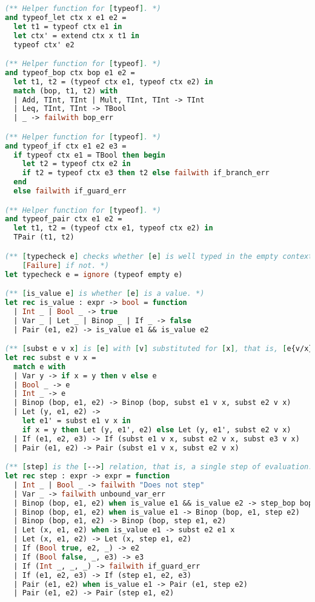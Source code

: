 \begin{lstlisting}[language=OCaml]
(** Helper function for [typeof]. *)
and typeof_let ctx x e1 e2 =
  let t1 = typeof ctx e1 in
  let ctx' = extend ctx x t1 in
  typeof ctx' e2

(** Helper function for [typeof]. *)
and typeof_bop ctx bop e1 e2 =
  let t1, t2 = (typeof ctx e1, typeof ctx e2) in
  match (bop, t1, t2) with
  | Add, TInt, TInt | Mult, TInt, TInt -> TInt
  | Leq, TInt, TInt -> TBool
  | _ -> failwith bop_err

(** Helper function for [typeof]. *)
and typeof_if ctx e1 e2 e3 =
  if typeof ctx e1 = TBool then begin
    let t2 = typeof ctx e2 in
    if t2 = typeof ctx e3 then t2 else failwith if_branch_err
  end
  else failwith if_guard_err

(** Helper function for [typeof]. *)
and typeof_pair ctx e1 e2 =
  let t1, t2 = (typeof ctx e1, typeof ctx e2) in
  TPair (t1, t2)

(** [typecheck e] checks whether [e] is well typed in the empty context. Raises:
    [Failure] if not. *)
let typecheck e = ignore (typeof empty e)

(** [is_value e] is whether [e] is a value. *)
let rec is_value : expr -> bool = function
  | Int _ | Bool _ -> true
  | Var _ | Let _ | Binop _ | If _ -> false
  | Pair (e1, e2) -> is_value e1 && is_value e2

(** [subst e v x] is [e] with [v] substituted for [x], that is, [e{v/x}]. *)
let rec subst e v x =
  match e with
  | Var y -> if x = y then v else e
  | Bool _ -> e
  | Int _ -> e
  | Binop (bop, e1, e2) -> Binop (bop, subst e1 v x, subst e2 v x)
  | Let (y, e1, e2) ->
    let e1' = subst e1 v x in
    if x = y then Let (y, e1', e2) else Let (y, e1', subst e2 v x)
  | If (e1, e2, e3) -> If (subst e1 v x, subst e2 v x, subst e3 v x)
  | Pair (e1, e2) -> Pair (subst e1 v x, subst e2 v x)

(** [step] is the [-->] relation, that is, a single step of evaluation. *)
let rec step : expr -> expr = function
  | Int _ | Bool _ -> failwith "Does not step"
  | Var _ -> failwith unbound_var_err
  | Binop (bop, e1, e2) when is_value e1 && is_value e2 -> step_bop bop e1 e2
  | Binop (bop, e1, e2) when is_value e1 -> Binop (bop, e1, step e2)
  | Binop (bop, e1, e2) -> Binop (bop, step e1, e2)
  | Let (x, e1, e2) when is_value e1 -> subst e2 e1 x
  | Let (x, e1, e2) -> Let (x, step e1, e2)
  | If (Bool true, e2, _) -> e2
  | If (Bool false, _, e3) -> e3
  | If (Int _, _, _) -> failwith if_guard_err
  | If (e1, e2, e3) -> If (step e1, e2, e3)
  | Pair (e1, e2) when is_value e1 -> Pair (e1, step e2)
  | Pair (e1, e2) -> Pair (step e1, e2)


\end{lstlisting}
